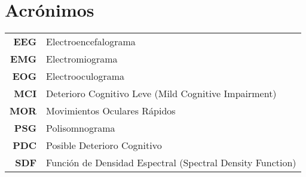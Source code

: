 \documentclass[12pt,a4paper]{mitthesis}
\begin{document}

\chapter*{Acr\'onimos}

\begin{tabular}{rl}
\textbf{EEG} & Electroencefalograma %
\\
\textbf{EMG} & Electromiograma %
\\
\textbf{EOG} & Electrooculograma %
\\
\textbf{MCI} & Deterioro Cognitivo Leve (Mild Cognitive Impairment)
\\
\textbf{MOR} & Movimientos Oculares R\'apidos
\\
\textbf{PSG} & Polisomnograma %
\\
\textbf{PDC} & Posible Deterioro Cognitivo
\\
\textbf{SDF} & Funci\'on de Densidad Espectral (Spectral Density Function)
\end{tabular}

\newpage


\tableofcontents
\newpage

\end{document}
